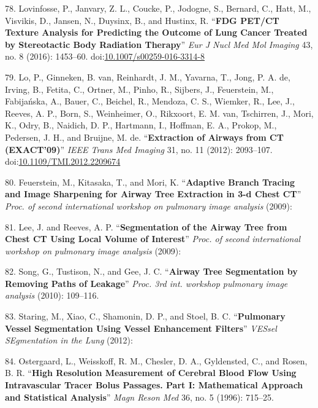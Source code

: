 \documentclass[11pt,]{article}
\begin{document}
\hypertarget{ref-Lovinfosse:2016aa}{}
78. Lovinfosse, P., Janvary, Z. L., Coucke, P., Jodogne, S., Bernard,
C., Hatt, M., Visvikis, D., Jansen, N., Duysinx, B., and Hustinx, R.
``\textbf{FDG PET/CT Texture Analysis for Predicting the Outcome of Lung
Cancer Treated by Stereotactic Body Radiation Therapy}'' \emph{Eur J
Nucl Med Mol Imaging} 43, no. 8 (2016): 1453--60.
doi:\href{https://doi.org/10.1007/s00259-016-3314-8}{10.1007/s00259-016-3314-8}

\hypertarget{ref-Lo:2012aa}{}
79. Lo, P., Ginneken, B. van, Reinhardt, J. M., Yavarna, T., Jong, P. A.
de, Irving, B., Fetita, C., Ortner, M., Pinho, R., Sijbers, J.,
Feuerstein, M., Fabijańska, A., Bauer, C., Beichel, R., Mendoza, C. S.,
Wiemker, R., Lee, J., Reeves, A. P., Born, S., Weinheimer, O., Rikxoort,
E. M. van, Tschirren, J., Mori, K., Odry, B., Naidich, D. P., Hartmann,
I., Hoffman, E. A., Prokop, M., Pedersen, J. H., and Bruijne, M. de.
``\textbf{Extraction of Airways from CT (EXACT'09)}'' \emph{IEEE Trans
Med Imaging} 31, no. 11 (2012): 2093--107.
doi:\href{https://doi.org/10.1109/TMI.2012.2209674}{10.1109/TMI.2012.2209674}

\hypertarget{ref-Feuerstein:2009aa}{}
80. Feuerstein, M., Kitasaka, T., and Mori, K. ``\textbf{Adaptive Branch
Tracing and Image Sharpening for Airway Tree Extraction in 3-d Chest
CT}'' \emph{Proc. of second international workshop on pulmonary image
analysis} (2009):

\hypertarget{ref-Lee:2009aa}{}
81. Lee, J. and Reeves, A. P. ``\textbf{Segmentation of the Airway Tree
from Chest CT Using Local Volume of Interest}'' \emph{Proc. of second
international workshop on pulmonary image analysis} (2009):

\hypertarget{ref-Song:2010aa}{}
82. Song, G., Tustison, N., and Gee, J. C. ``\textbf{Airway Tree
Segmentation by Removing Paths of Leakage}'' \emph{Proc. 3rd int.
workshop pulmonary image analysis} (2010): 109--116.

\hypertarget{ref-Staring:2012aa}{}
83. Staring, M., Xiao, C., Shamonin, D. P., and Stoel, B. C.
``\textbf{Pulmonary Vessel Segmentation Using Vessel Enhancement
Filters}'' \emph{VESsel SEgmentation in the Lung} (2012):

\hypertarget{ref-Ostergaard:1996aa}{}
84. Ostergaard, L., Weisskoff, R. M., Chesler, D. A., Gyldensted, C.,
and Rosen, B. R. ``\textbf{High Resolution Measurement of Cerebral Blood
Flow Using Intravascular Tracer Bolus Passages. Part I: Mathematical
Approach and Statistical Analysis}'' \emph{Magn Reson Med} 36, no. 5
(1996): 715--25.
\end{document}
